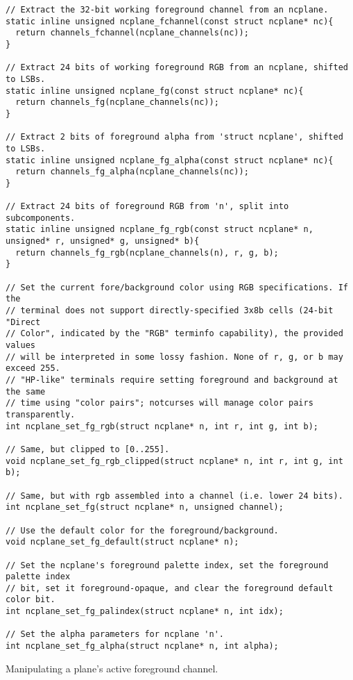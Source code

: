 \begin{listing}[!htb]
\begin{verbatim}
// Extract the 32-bit working foreground channel from an ncplane.
static inline unsigned ncplane_fchannel(const struct ncplane* nc){
  return channels_fchannel(ncplane_channels(nc));
}

// Extract 24 bits of working foreground RGB from an ncplane, shifted to LSBs.
static inline unsigned ncplane_fg(const struct ncplane* nc){
  return channels_fg(ncplane_channels(nc));
}

// Extract 2 bits of foreground alpha from 'struct ncplane', shifted to LSBs.
static inline unsigned ncplane_fg_alpha(const struct ncplane* nc){
  return channels_fg_alpha(ncplane_channels(nc));
}

// Extract 24 bits of foreground RGB from 'n', split into subcomponents.
static inline unsigned ncplane_fg_rgb(const struct ncplane* n, unsigned* r, unsigned* g, unsigned* b){
  return channels_fg_rgb(ncplane_channels(n), r, g, b);
}

// Set the current fore/background color using RGB specifications. If the
// terminal does not support directly-specified 3x8b cells (24-bit "Direct
// Color", indicated by the "RGB" terminfo capability), the provided values
// will be interpreted in some lossy fashion. None of r, g, or b may exceed 255.
// "HP-like" terminals require setting foreground and background at the same
// time using "color pairs"; notcurses will manage color pairs transparently.
int ncplane_set_fg_rgb(struct ncplane* n, int r, int g, int b);

// Same, but clipped to [0..255].
void ncplane_set_fg_rgb_clipped(struct ncplane* n, int r, int g, int b);

// Same, but with rgb assembled into a channel (i.e. lower 24 bits).
int ncplane_set_fg(struct ncplane* n, unsigned channel);

// Use the default color for the foreground/background.
void ncplane_set_fg_default(struct ncplane* n);

// Set the ncplane's foreground palette index, set the foreground palette index
// bit, set it foreground-opaque, and clear the foreground default color bit.
int ncplane_set_fg_palindex(struct ncplane* n, int idx);

// Set the alpha parameters for ncplane 'n'.
int ncplane_set_fg_alpha(struct ncplane* n, int alpha);
\end{verbatim}
\caption{Manipulating a plane's active foreground channel.}
\label{listing:planefg}
\end{listing}

